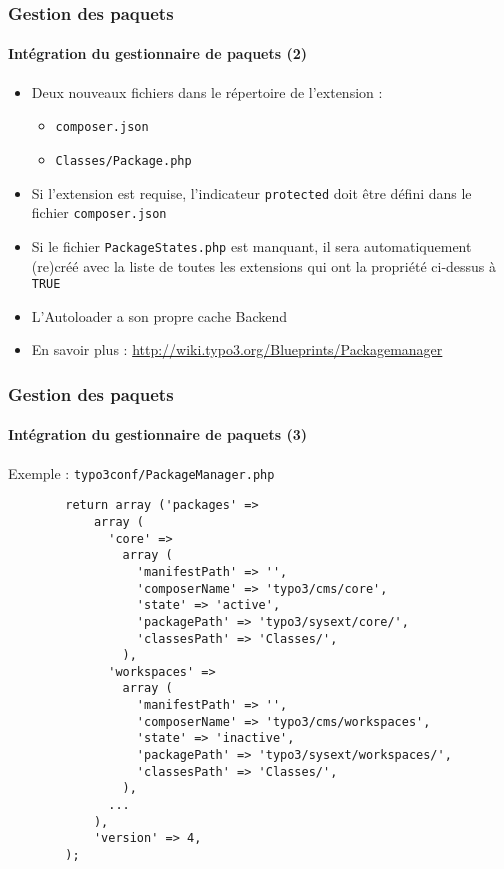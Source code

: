 \begin{frame}[fragile]
	\frametitle{Gestion des paquets}
	\framesubtitle{Intégration du gestionnaire de paquets (2)}

	\begin{itemize}

		\item Deux nouveaux fichiers dans le répertoire de l'extension :

			\begin{itemize}
				\item \texttt{composer.json}
				\item \texttt{Classes/Package.php}
			\end{itemize}

		\item Si l'extension est requise, l'indicateur \texttt{protected} doit être défini dans le fichier \texttt{composer.json}

		\item Si le fichier \texttt{PackageStates.php} est manquant, il sera automatiquement (re)créé avec la liste de toutes les extensions qui ont la propriété ci-dessus à \texttt{TRUE}

		\item L'Autoloader a son propre cache Backend

		\item En savoir plus :\newline
			\url{http://wiki.typo3.org/Blueprints/Packagemanager}

	\end{itemize}

\end{frame}


\begin{frame}[fragile]
	\frametitle{Gestion des paquets}
	\framesubtitle{Intégration du gestionnaire de paquets (3)}

	Exemple : \texttt{typo3conf/PackageManager.php}

	\lstset{
		basicstyle=\tiny\ttfamily
	}

	\begin{lstlisting}
		return array ('packages' =>
		    array (
		      'core' =>
		        array (
		          'manifestPath' => '',
		          'composerName' => 'typo3/cms/core',
		          'state' => 'active',
		          'packagePath' => 'typo3/sysext/core/',
		          'classesPath' => 'Classes/',
		        ),
		      'workspaces' =>
		        array (
		          'manifestPath' => '',
		          'composerName' => 'typo3/cms/workspaces',
		          'state' => 'inactive',
		          'packagePath' => 'typo3/sysext/workspaces/',
		          'classesPath' => 'Classes/',
		        ),
		      ...
		    ),
		    'version' => 4,
		);
	\end{lstlisting}

\end{frame}


